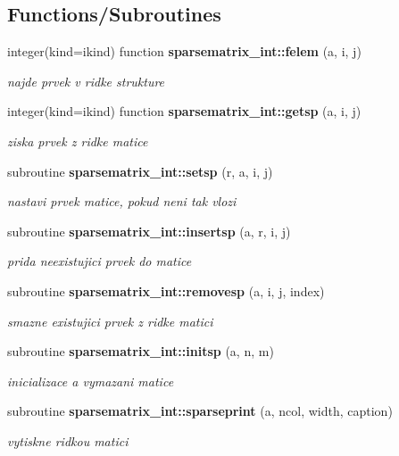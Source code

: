 \subsection*{Functions/\+Subroutines}
\begin{DoxyCompactItemize}
\item 
integer(kind=ikind) function {\bf sparsematrix\+\_\+int\+::felem} (a, i, j)
\begin{DoxyCompactList}\small\item\em najde prvek v ridke strukture \end{DoxyCompactList}\item 
integer(kind=ikind) function {\bf sparsematrix\+\_\+int\+::getsp} (a, i, j)
\begin{DoxyCompactList}\small\item\em ziska prvek z ridke matice \end{DoxyCompactList}\item 
subroutine {\bf sparsematrix\+\_\+int\+::setsp} (r, a, i, j)
\begin{DoxyCompactList}\small\item\em nastavi prvek matice, pokud neni tak vlozi \end{DoxyCompactList}\item 
subroutine {\bf sparsematrix\+\_\+int\+::insertsp} (a, r, i, j)
\begin{DoxyCompactList}\small\item\em prida neexistujici prvek do matice \end{DoxyCompactList}\item 
subroutine {\bf sparsematrix\+\_\+int\+::removesp} (a, i, j, index)
\begin{DoxyCompactList}\small\item\em smazne existujici prvek z ridke matici \end{DoxyCompactList}\item 
subroutine {\bf sparsematrix\+\_\+int\+::initsp} (a, n, m)
\begin{DoxyCompactList}\small\item\em inicializace a vymazani matice \end{DoxyCompactList}\item 
subroutine {\bf sparsematrix\+\_\+int\+::sparseprint} (a, ncol, width, caption)
\begin{DoxyCompactList}\small\item\em vytiskne ridkou matici \end{DoxyCompactList}\item 

\end{DoxyCompactItemize}
